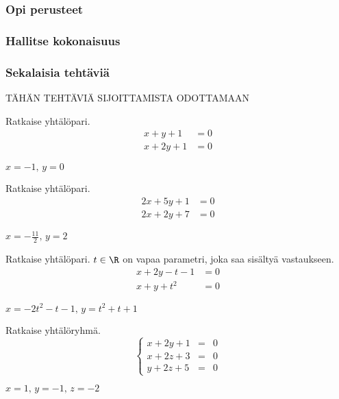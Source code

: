 \begin{tehtavasivu}

\subsubsection*{Opi perusteet}

\subsubsection*{Hallitse kokonaisuus}

\subsubsection*{Sekalaisia tehtäviä}

TÄHÄN TEHTÄVIÄ SIJOITTAMISTA ODOTTAMAAN

\begin{tehtava}
    Ratkaise yhtälöpari.
    \begin{align*}
        x+y+1 &= 0 \\
        x+2y+1 &=0
    \end{align*}
    \begin{vastaus}
        $x = -1, \, y = 0$
    \end{vastaus}
\end{tehtava}

\begin{tehtava}
    Ratkaise yhtälöpari.
    \begin{align*}
        2x+5y+1 &= 0 \\
        2x+2y+7 &=0
    \end{align*}
    \begin{vastaus}
        $x = -\frac{11}{2}, \, y = 2$
    \end{vastaus}
\end{tehtava}

\begin{tehtava}
    Ratkaise yhtälöpari. $t \in \R$ on vapaa parametri, joka saa sisältyä vastaukseen.
    \begin{align*}
        x+2y-t-1 &= 0 \\
        x+y+t^2 &=0
    \end{align*}
    \begin{vastaus}
        $x = -2t^2-t-1, \, y = t^2+t+1$
    \end{vastaus}
\end{tehtava}

\begin{tehtava}
    Ratkaise yhtälöryhmä.
	$$\left\{    
    \begin{array}{rcl}
        x+2y+1 &=&0 \\
        x+2z+3 &=&0 \\
        y+2z+5 &=&0
    \end{array}
    \right.$$
    \begin{vastaus}
        $x = 1, \, y = -1, \, z = -2$
    \end{vastaus}
\end{tehtava}


\end{tehtavasivu}

